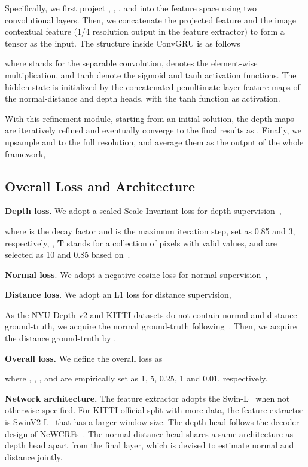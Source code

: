 \documentclass[10pt,twocolumn,letterpaper]{article}
\begin{document}
Specifically, we first project , , ,  and  into the feature space using two convolutional layers. Then, we concatenate the projected feature and the image contextual feature (1/4 resolution output in the feature extractor) to form a tensor  as the input. The structure inside ConvGRU is as follows




where  stands for the separable  convolution,  denotes the element-wise multiplication,  and tanh denote the sigmoid and tanh activation functions. The hidden state  is initialized by the concatenated penultimate layer feature maps of the normal-distance and depth heads, with the tanh function as activation.


With this refinement module, starting from an initial solution, the depth maps are iteratively refined and eventually converge to the final results as . Finally, we upsample  and  to the full resolution, and average them as the output of the whole framework,



\subsection{Overall Loss and Architecture}

\textbf{Depth loss}. We adopt a
scaled Scale-Invariant loss for depth supervision~\cite{lee2019big},

where  is the decay factor and  is the maximum iteration step, set as 0.85 and 3, respectively, , \textbf{T} stands for a collection of pixels with valid values,  and  are selected as 10 and 0.85 based on~\cite{lee2019big}.

\textbf{Normal loss}. We adopt a negative cosine loss for normal supervision~\cite{eigen2015predicting},


\textbf{Distance loss}. We adopt an L1 loss for distance supervision,


As the NYU-Depth-v2 and KITTI datasets do not contain normal and distance ground-truth, we acquire the normal ground-truth following~\cite{qiu2019deeplidar}. Then, we acquire the distance ground-truth by  .

\textbf{Overall loss.} We define the overall loss as

where , , ,  and  are empirically set as 1, 5, 0.25, 1 and 0.01, respectively. 

\textbf{Network architecture.} The feature extractor adopts the Swin-L~\cite{Liu_2021_ICCV} when not otherwise specified. For KITTI official split with more data, the feature extractor is SwinV2-L~\cite{liu2022swin} that has a larger window size. The depth head follows the decoder design of NeWCRFs~\cite{Yuan_2022_CVPR}. The normal-distance head shares a same architecture as depth head apart from the final layer, which is devised to estimate normal and distance jointly.
\end{document}
